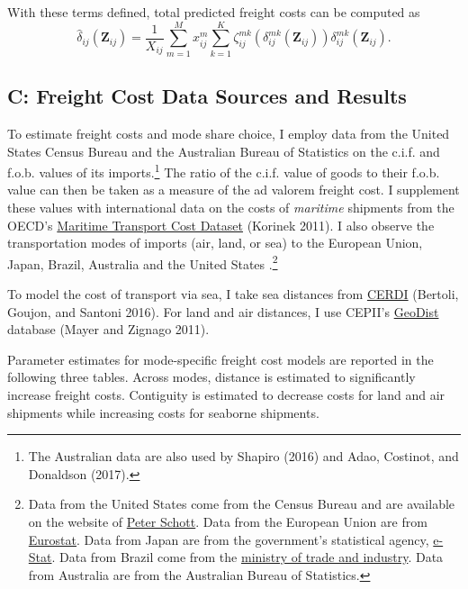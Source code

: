 \documentclass{puthesis}
\begin{document}
With these terms defined, total predicted freight costs can be computed
as \[
\hat{\delta}_{ij} \left( \bm{Z}_{ij} \right) = \frac{1}{X_{ij}} \sum_{m = 1}^M x_{ij}^m \sum_{k=1}^K \zeta_{ij}^{m k}\left( \delta_{ij}^{mk}(\bm{Z}_{ij}) \right) \delta_{ij}^{mk}(\bm{Z}_{ij}) .
\]

\subsection{C: Freight Cost Data Sources and Results}

To estimate freight costs and mode share choice, I employ data from the
United States Census Bureau and the Australian Bureau of Statistics on
the c.i.f. and f.o.b. values of its imports.\footnote{The Australian
  data are also used by Shapiro (2016) and Adao, Costinot, and Donaldson
  (2017).} The ratio of the c.i.f. value of goods to their f.o.b. value
can then be taken as a measure of the ad valorem freight cost. I
supplement these values with international data on the costs of
\emph{maritime} shipments from the OECD's
\href{https://doi.org/10.1787/data-00490-en}{Maritime Transport Cost
Dataset} (Korinek 2011). I also observe the transportation modes of
imports (air, land, or sea) to the European Union, Japan, Brazil,
Australia and the United States .\footnote{Data from the United States
  come from the Census Bureau and are available on the website of
  \href{http://faculty.som.yale.edu/peterschott/sub_international.htm}{Peter
  Schott}. Data from the European Union are from
  \href{https://ec.europa.eu/eurostat}{Eurostat}. Data from Japan are
  from the government's statistical agency,
  \href{https://www.e-stat.go.jp/en/stat-search/files?page=1\&toukei=00350300\&bunya_l=16\&tstat=000001013142\&result_page=1\&second=1}{e-Stat}.
  Data from Brazil come from the
  \href{http://comexstat.mdic.gov.br/en/home}{ministry of trade and
  industry}. Data from Australia are from the Australian Bureau of
  Statistics.}

To model the cost of transport via sea, I take sea distances from
\href{http://www.ferdi.fr/en/indicator/cerdi-seadistance-database}{CERDI}
(Bertoli, Goujon, and Santoni 2016). For land and air distances, I use
CEPII's
\href{http://www.cepii.fr/cepii/en/bdd_modele/presentation.asp?id=6}{GeoDist}
database (Mayer and Zignago 2011).

Parameter estimates for mode-specific freight cost models are reported
in the following three tables. Across modes, distance is estimated to
significantly increase freight costs. Contiguity is estimated to
decrease costs for land and air shipments while increasing costs for
seaborne shipments.
\end{document}
